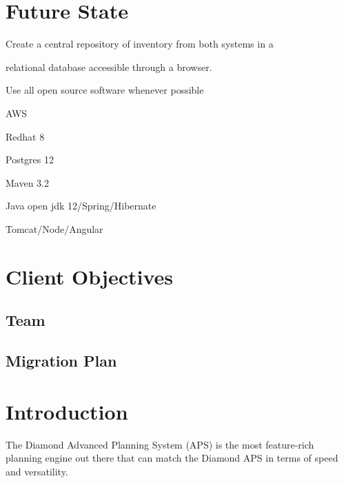 \documentclass[letterpaper,10pt,english]{sphinxmanual}
\begin{document}
\chapter{Future State}
\label{APS/APS-Features-and-Benefits:future-state}
\begin{DUlineblock}{0em}
\item[] Create a central repository of inventory from both systems in a
\end{DUlineblock}

relational \textbar{} database accessible through a browser.

Use all open source software whenever possible

\begin{DUlineblock}{0em}
\item[] AWS
\item[] Redhat 8
\item[] Postgres 12
\item[] Maven 3.2
\item[] Java open jdk 12/Spring/Hibernate
\item[] Tomcat/Node/Angular
\end{DUlineblock}


\chapter{Client  Objectives}
\label{APS/APS-Features-and-Benefits:client-objectives}

\section{Team}
\label{APS/APS-Features-and-Benefits:team}

\section{Migration Plan}
\label{APS/APS-Features-and-Benefits:migration-plan}

\chapter{Introduction}
\label{APS/APS-Features-and-Benefits:introduction}
The Diamond Advanced Planning System (APS) is the most feature-rich
planning engine out there that can match the Diamond APS in terms of
speed and versatility.
\end{document}
